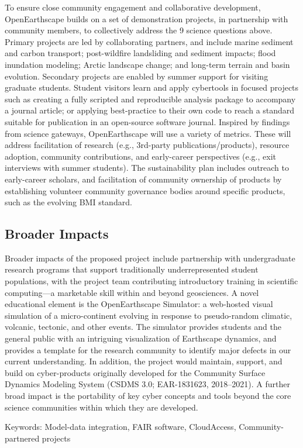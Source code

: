 To ensure close community engagement and collaborative development, OpenEarthscape builds on a set of demonstration projects, in partnership with community members, to collectively address the 9 science questions above. Primary projects are led by collaborating partners, and include marine sediment and carbon transport; post-wildfire landsliding and sediment impacts; flood inundation modeling; Arctic landscape change; and long-term terrain and basin evolution. Secondary projects are enabled by summer support for visiting graduate students. Student visitors learn and apply cybertools in focused projects such as creating a fully scripted and reproducible analysis package to accompany a journal article; or applying best-practice to their own code to reach a standard suitable for publication in an open-source software journal. Inspired by findings from science gateways, OpenEarthscape will use a variety of metrics. These will address facilitation of research (e.g., 3rd-party publications/products), resource adoption, community contributions, and early-career perspectives (e.g., exit interviews with summer students). The sustainability plan includes outreach to early-career scholars, and facilitation of community ownership of products by establishing volunteer community governance bodies around specific products, such as the evolving BMI standard.


\subsection*{Broader Impacts}

Broader impacts of the proposed project include partnership with undergraduate research programs that support traditionally underrepresented student populations, with the project team contributing introductory training in scientific computing---a marketable skill within and beyond geosciences. A novel educational element is the OpenEarthscape Simulator: a web-hosted visual simulation of a micro-continent evolving in response to pseudo-random climatic, volcanic, tectonic, and other events. The simulator provides students and the general public with an intriguing visualization of Earthscape dynamics, and provides a template for the research community to identify major defects in our current understanding. In addition, the project would maintain, support, and build on cyber-products originally developed for the Community Surface Dynamics Modeling System (CSDMS 3.0; EAR-1831623, 2018--2021). A further broad impact is the portability of key cyber concepts and tools beyond the core science communities within which they are developed.

Keywords: Model-data integration, FAIR software, CloudAccess, Community-partnered projects
